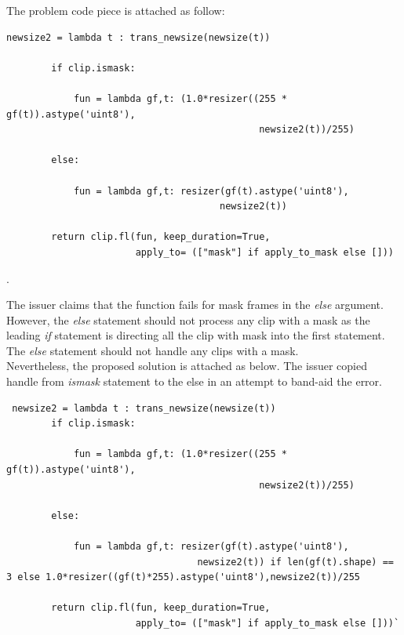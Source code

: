 \documentclass[a4paper, 11pt]{article}
\begin{document}
The problem code piece is attached as follow:

\begin{lstlisting}
newsize2 = lambda t : trans_newsize(newsize(t))

        if clip.ismask:

            fun = lambda gf,t: (1.0*resizer((255 * gf(t)).astype('uint8'),
                                             newsize2(t))/255)

        else:

            fun = lambda gf,t: resizer(gf(t).astype('uint8'),
                                      newsize2(t))

        return clip.fl(fun, keep_duration=True,
                       apply_to= (["mask"] if apply_to_mask else []))
\end{lstlisting}.

The issuer claims that the function fails for mask frames in the \textit{else} argument. However, the \textit{else} statement should not process any clip with a mask as the leading \textit{if} statement is directing all the clip with mask into the first statement. The \textit{else} statement should not handle any clips with a mask. \\

Nevertheless, the proposed solution is attached as below. The issuer copied handle from \textit{ismask} statement to the else in an attempt to band-aid the error.
\begin{lstlisting}
 newsize2 = lambda t : trans_newsize(newsize(t))
        if clip.ismask:
            
            fun = lambda gf,t: (1.0*resizer((255 * gf(t)).astype('uint8'),
                                             newsize2(t))/255)

        else:
            
            fun = lambda gf,t: resizer(gf(t).astype('uint8'),
                                  newsize2(t)) if len(gf(t).shape) == 3 else 1.0*resizer((gf(t)*255).astype('uint8'),newsize2(t))/255

        return clip.fl(fun, keep_duration=True,
                       apply_to= (["mask"] if apply_to_mask else []))`
\end{lstlisting}
\end{document}
